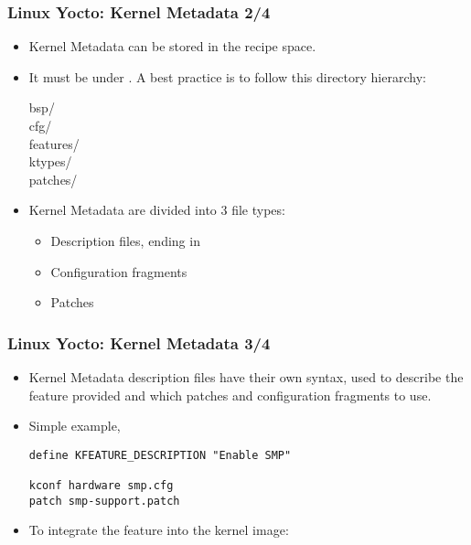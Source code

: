 \begin{frame}
  \frametitle{Linux Yocto: Kernel Metadata 2/4}
  \begin{itemize}
    \item Kernel Metadata can be stored in the 
      recipe space.
    \item It must be under . A best practice
      is to follow this directory hierarchy:
      \begin{description}
        \item[bsp/]
        \item[cfg/]
        \item[features/]
        \item[ktypes/]
        \item[patches/]
      \end{description}
    \item Kernel Metadata are divided into 3 file types:
      \begin{itemize}
        \item Description files, ending in 
        \item Configuration fragments
        \item Patches
      \end{itemize}
  \end{itemize}
\end{frame}

\begin{frame}[fragile]
  \frametitle{Linux Yocto: Kernel Metadata 3/4}
  \begin{itemize}
    \item Kernel Metadata description files have their own syntax,
      used to describe the feature provided and which patches and
      configuration fragments to use.
    \item Simple example, 
      \begin{block}{}
        \begin{verbatim}
define KFEATURE_DESCRIPTION "Enable SMP"

kconf hardware smp.cfg
patch smp-support.patch
        \end{verbatim}
      \end{block}
    \item To integrate the feature into the kernel image:
  \end{itemize}
\end{frame}

